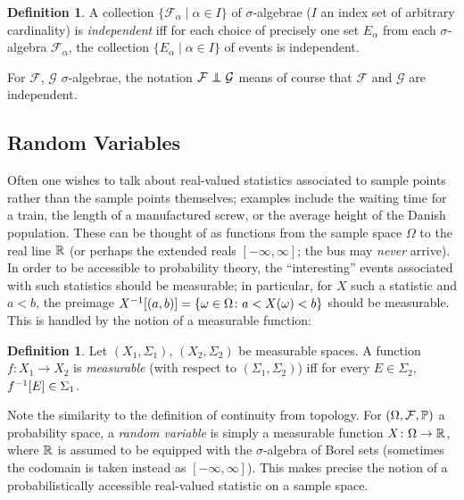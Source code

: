 \documentclass[leqno]{article}
\theoremstyle{definition}
\newtheorem{definition}[theorem]{Definition}
\newcommand{\bldset}[2]{\{{#1}\mid{#2}\}}
\newcommand\indep{\protect\mathpalette{\protect\independenT}{\perp}}
\def\independenT#1#2{\mathrel{\rlap{$#1#2$}\mkern2mu{#1#2}}}
\begin{document}
\begin{definition}
A collection $\bldset{\mathcal F_\alpha}{\alpha \in I}$ of $\sigma$-algebrae ($I$ an index set of arbitrary cardinality) is {\em independent} iff for each choice of precisely one set $E_\alpha$ from each $\sigma$-algebra $\mathcal F_\alpha$, the collection $\bldset{E_\alpha}{\alpha \in I}$ of events is independent.
\end{definition}

For $\mathcal F$, $\mathcal G$ $\sigma$-algebrae, the notation $\mathcal F \indep \mathcal G$ means of course that $\mathcal F$ and $\mathcal G$ are independent.

\subsection{Random Variables}

Often one wishes to talk about real-valued statistics associated to sample points rather than the sample points themselves; examples include the waiting time for a train, the length of a manufactured screw, or the average height of the Danish population. These can be thought of as functions from the sample space $\Omega$ to the real line $\R$ (or perhaps the extended reals $[-\infty, \infty]$; the bus may {\em never} arrive). In order to be accessible to probability theory, the ``interesting'' events associated with such statistics should be measurable; in particular, for $X$ such a statistic and $a < b$, the preimage $X\inv[(a,b)] = \{\omega \in \Omega\colon a < X(\omega) < b\}$ should be measurable. This is handled by the notion of a measurable function:

\begin{definition}
Let $(X_1, \Sigma_1)$, $(X_2, \Sigma_2)$ be measurable spaces. A function $f\colon X_1 \rightarrow X_2$ is {\em measurable} (with respect to $(\Sigma_1, \Sigma_2)$) iff for every $E \in \Sigma_2$, $f\inv[E] \in \Sigma_1$.
\end{definition}

Note the similarity to the definition of continuity from topology. For $(\Omega, \mathcal F, \P)$ a probability space, a {\em random variable} is simply a measurable function \linebreak $X\colon \Omega \rightarrow \R$, where $\R$ is assumed to be equipped with the $\sigma$-algebra of Borel sets (sometimes the codomain is taken instead as $[-\infty, \infty]$). This makes precise the notion of a probabilistically accessible real-valued statistic on a sample space.
\end{document}
